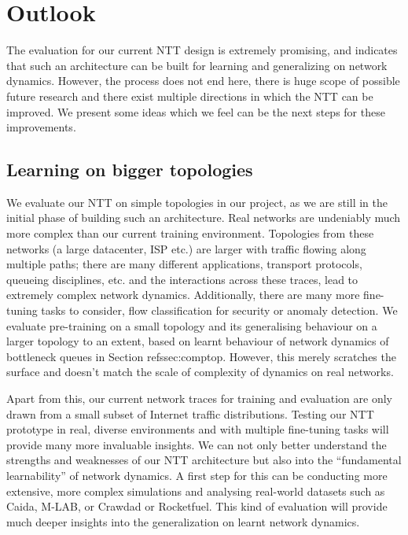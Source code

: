 \chapter{Outlook}
\label{cha:outlook}

The evaluation for our current NTT design is extremely promising, and indicates that such an architecture can be built for learning and generalizing on network dynamics. However, the process does not end here, there is huge scope of possible future research and there exist multiple directions in which the NTT can be improved. We present some ideas which we feel can be the next steps for these improvements.

\section{Learning on bigger topologies}
\label{sec:biggertopos}

We evaluate our NTT on simple topologies in our project, as we are still in the initial phase of building such an architecture. Real networks are undeniably much more complex than our current training environment. Topologies from these networks (\eg a large datacenter, ISP etc.) are larger with traffic flowing along multiple paths; there are many different applications, transport protocols, queueing disciplines, etc. and the interactions across these traces, lead to extremely complex network dynamics. Additionally, there are many more fine-tuning tasks to consider, \eg flow classification for security or anomaly detection. We evaluate pre-training on a small topology and its generalising behaviour on a larger topology to an extent, based on learnt behaviour of network dynamics of bottleneck queues in Section ref{ssec:comptop}. However, this merely scratches the surface and doesn't match the scale of complexity of dynamics on real networks. 

Apart from this, our current network traces for training and evaluation are only drawn from a small subset of Internet traffic distributions\cite{homa}. Testing our NTT prototype in real, diverse environments and with multiple fine-tuning tasks will provide many more invaluable insights. We can not only better understand the strengths and weaknesses of our NTT architecture but also into the ``fundamental learnability'' of network dynamics. A first step for this can be conducting more extensive, more complex simulations and analysing real-world datasets such as Caida\cite{caida}, M-LAB\cite{mlab}, or Crawdad\cite{crawdad} or Rocketfuel\cite{rocketfuel}. This kind of evaluation will provide much deeper insights into the generalization on learnt network dynamics.

